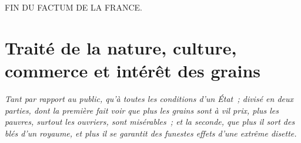 \documentclass[french,twoside]{book} %
\newcommand\chapteropen{} %
\newcommand\chaptercont{} %
\newcommand\chapterclose{} %
\begin{document}
\begin{raggedleft}FIN DU FACTUM DE LA FRANCE.\end{raggedleft}
\chapterclose


\chapteropen
\chapter[{Traité de la nature, culture, commerce et intérêt des grains}]{Traité de la nature, culture, commerce et intérêt des grains}\renewcommand{\leftmark}{Traité de la nature, culture, commerce et intérêt des grains}

\begin{center}\emph{Tant par rapport au public, qu’à toutes les conditions d’un État ; divisé en deux parties, dont la première fait voir que plus les grains sont à vil prix, plus les pauvres, surtout les ouvriers, sont misérables ; et la seconde, que plus il sort des blés d’un royaume, et plus il se garantit des funestes effets d’une extrême disette.}\end{center}

\chaptercont
\end{document}
